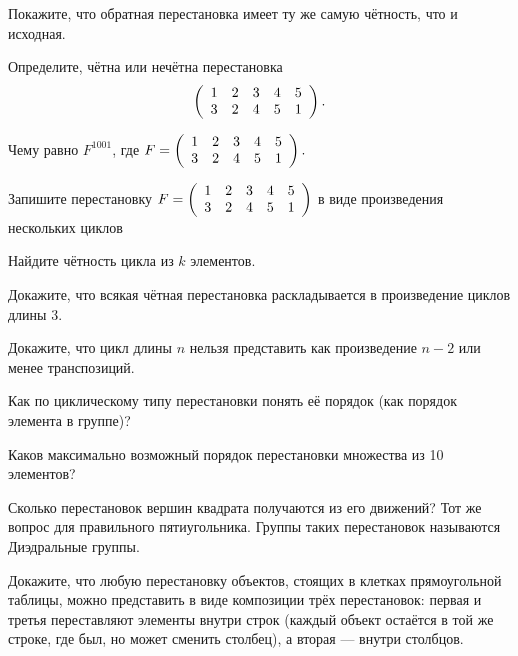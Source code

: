\documentclass{article}
\begin{document}
\begin{enumerate_boxed}
        \item Покажите, что обратная перестановка имеет ту же самую чётность, что и исходная.

        \item Определите, чётна или нечётна перестановка
        \[\left(
        \begin{array}{c c c c c}
            1 & 2 & 3 & 4 & 5 \\
            3 & 2 & 4 & 5 & 1
        \end{array}
        \right).\]

        \item Чему равно $F^{1001}$, где $F =
        \left(
        \begin{array}{c c c c c}
            1 & 2 & 3 & 4 & 5 \\
            3 & 2 & 4 & 5 & 1
        \end{array}
        \right).$

        \item Запишите перестановку $F =
        \left(
        \begin{array}{c c c c c}
            1 & 2 & 3 & 4 & 5 \\
            3 & 2 & 4 & 5 & 1
        \end{array}
        \right)$ в виде произведения нескольких циклов

        \item Найдите чётность цикла из $k$ элементов.

        \item Докажите, что всякая чётная перестановка раскладывается в произведение циклов длины 3.

        \item Докажите, что цикл длины $n$ нельзя представить как произведение $n - 2$ или менее транспозиций.

        \item Как по циклическому типу перестановки понять её порядок (как порядок элемента в группе)?

        \item Каков максимально возможный порядок перестановки множества из 10 элементов?

        \item Сколько перестановок вершин квадрата получаются из его движений?
        Тот же вопрос для правильного пятиугольника.
        Группы таких перестановок называются Диэдральные группы.

        \item Докажите, что любую перестановку объектов, стоящих в клетках прямоугольной таблицы, можно представить в виде композиции трёх перестановок: первая и третья переставляют элементы внутри строк (каждый объект остаётся в той же строке, где был, но может сменить столбец), а вторая — внутри столбцов.

    \end{enumerate_boxed}
\end{document}
